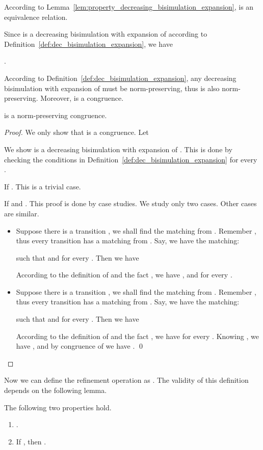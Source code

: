 \documentclass{llncs}
\begin{document}
According to Lemma~\ref{lem:property_decreasing_bisimulation_expansion},  is an equivalence relation.

Since  is a decreasing  bisimulation with expansion of  according to Definition~\ref{def:dec_bisimulation_expansion}, we have
\begin{lemma}\label{lem:decreasing_bisimulation_inequality}
.
\end{lemma}

According to Definition~\ref{def:dec_bisimulation_expansion}, any decreasing  bisimulation with expansion of  must be norm-preserving, thus  is also norm-preserving.  Moreover,  is a congruence.

\begin{lemma}
 is a norm-preserving congruence.
\end{lemma}

\begin{proof}
We only show that  is a congruence.
Let

We show  is a decreasing  bisimulation with expansion of . This is done by
checking the conditions in Definition~\ref{def:dec_bisimulation_expansion}
for every .

If .  This is a trivial case.

If  and . This proof is done by case studies.
We study only two cases. Other cases are similar.

\begin{itemize}
 \item
 Suppose there is a transition , we shall find the matching from . Remember  , thus every transition  has a matching from . Say, we have the matching:

such that   and  for every .  Then we have

According to the definition of  and the fact ,  we have , and  for every .

\item
 Suppose there is a transition , we shall find the matching from . Remember  , thus every transition  has a matching from . Say, we have the matching:

such that   and  for every .  Then we have

According to the definition of  and the fact ,  we have   for every .   Knowing , we have , and by congruence of  we have . \qed

\end{itemize}
\end{proof}

Now we can define the refinement operation  as . The validity of this definition depends on the following lemma.
\begin{lemma}
The following two properties hold.
\begin{enumerate}
\item
.

\item
If , then .
\end{enumerate}
\end{lemma}
\end{document}
